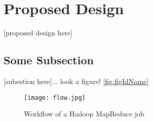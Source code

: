 \section{Proposed Design}
\label{section:propeseddesign}
[proposed design here]

\subsection{Some Subsection}
[subestion here]... look a figure! \ref{fig:figIdName}

\begin{figure}[ht!]
\centering
\texttt{[image: flow.jpg]}
\caption{Workflow of a Hadoop MapReduce job}
\label{fig:flow}
\end{figure}

